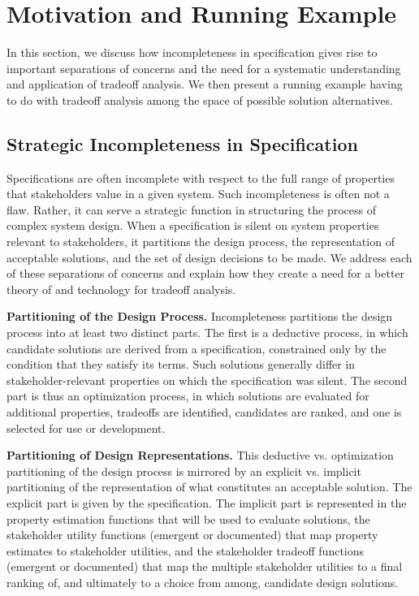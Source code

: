 \documentclass[10pt,conference]{IEEEtran}
\begin{document}

\section{Motivation and Running Example}
\label{problem}

In this section, we discuss how incompleteness in specification gives rise to important separations of concerns and the need for a systematic understanding and application of tradeoff analysis. We then present a running example having to do with tradeoff analysis among the space of possible solution alternatives.

\subsection{Strategic Incompleteness in Specification} Specifications are often incomplete with respect to the full range of properties that stakeholders value in a given system. Such incompleteness is often not a flaw. Rather, it can serve a strategic function in structuring the process of complex system design. When a specification is silent on system properties relevant to stakeholders, it partitions the design process, the representation of acceptable solutions, and the set of design decisions to be made. We address each of these separations of concerns and explain how they create a need for a better theory of and technology for tradeoff analysis.

\textbf{Partitioning of the Design Process.}
Incompleteness partitions the design process into at least two distinct parts. The first is a deductive process, in which candidate solutions are derived from a specification, constrained only by the condition that they satisfy its terms. Such solutions generally differ in stakeholder-relevant properties on which the specification was silent. The second part is thus an optimization process, in which solutions are evaluated for additional properties, tradeoffs are identified, candidates are ranked, and one is selected for use or development.


\textbf{Partitioning of Design Representations.}
This deductive vs. optimization partitioning of the design process is mirrored by an explicit vs. implicit partitioning of the representation of what constitutes an acceptable solution. The explicit part is given by the specification. The implicit part is represented in the property estimation functions that will be used to evaluate solutions, the stakeholder utility functions (emergent or documented) that map property estimates to stakeholder utilities, and the stakeholder tradeoff functions (emergent or documented) that map the multiple stakeholder utilities to a final ranking of, and ultimately to a choice from among, candidate design solutions.  
\end{document}
